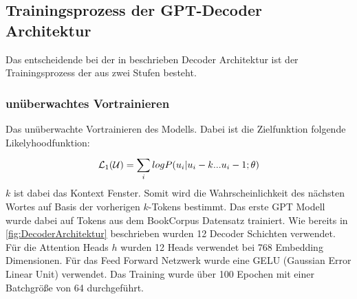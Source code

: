 \documentclass[conference]{IEEEtran}
\begin{document}
\subsection{Trainingsprozess der GPT-Decoder Architektur}
Das entscheidende bei der in \cite{radfordImprovingLanguageUnderstanding} beschrieben Decoder Architektur ist der Trainingsprozess der aus zwei Stufen besteht.
\subsubsection{unüberwachtes Vortrainieren}
Das unüberwachte Vortrainieren des Modells. Dabei ist die Zielfunktion folgende Likelyhoodfunktion:
\begin{equation}
    {\cal L}_1({\cal U}) = \sum_{i}^{} log P( u_i|u_i-k ... u_i-1;\theta)
    \label{eq:Zielfunktion1}
\end{equation}
$k$ ist dabei das Kontext Fenster. Somit wird die Wahrscheinlichkeit des nächsten Wortes auf Basis der vorherigen $k$-Tokens bestimmt. Das erste GPT Modell wurde dabei auf Tokens aus dem BookCorpus Datensatz trainiert. Wie bereits in \autoref{fig:DecoderArchitektur} beschrieben wurden 12 Decoder Schichten verwendet. Für die Attention Heads $h$ wurden 12 Heads verwendet bei 768 Embedding Dimensionen. Für das Feed Forward Netzwerk wurde eine GELU (Gaussian Error Linear Unit) verwendet. Das Training wurde über 100 Epochen mit einer Batchgröße von 64 durchgeführt.
\end{document}
